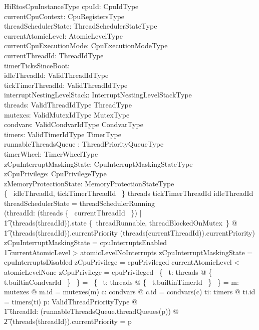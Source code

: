 \documentclass[11pt,letterpaper,twoside,openany]{book}
\begin{document}
\begin{schema}{HiRtosCpuInstanceType}
    cpuId: CpuIdType \\
    currentCpuContext: CpuRegistersType \\
    threadSchedulerState: ThreadSchedulerStateType \\
    currentAtomicLevel: AtomicLevelType \\
    currentCpuExecutionMode: CpuExecutionModeType \\
    currentThreadId: ThreadIdType \\
    timerTicksSinceBoot: \nat \\
    idleThreadId: ValidThreadIdType \\
    tickTimerThreadId: ValidThreadIdType \\
    interruptNestingLevelStack: InterruptNestingLevelStackType \\
    threads: ValidThreadIdType \finj ThreadType \\
    mutexes: ValidMutexIdType \finj MutexType \\
    condvars: ValidCondvarIdType \finj CondvarType \\
    timers: ValidTimerIdType \finj TimerType \\
    runnableThreadsQueue : ThreadPriorityQueueType \\
    timerWheel: TimerWheelType \\
    zCpuInterruptMaskingState: CpuInterruptMaskingStateType \\
    zCpuPrivilege: CpuPrivilegeType \\
    zMemoryProtectionState: MemoryProtectionStateType \\
\where
    \{~ idleThreadId, tickTimerThreadId ~\} \subseteq \dom threads
\also
    tickTimerThreadId \neq idleThreadId
\also
    threadSchedulerState = threadSchedulerRunning \implies \\
    (\forall threadId: (\dom threads \setminus \{~ currentThreadId ~\}) | \\
\t1    (threads(threadId)).state \in \{~threadRunnable, threadBlockedOnMutex~\}  @ \\
\t1    (threads(threadId)).currentPriority \leq (threads(currentThreadId)).currentPriority)
\also
    zCpuInterruptMaskingState = cpuInterruptsEnabled \iff \\
\t1 currentAtomicLevel > atomicLevelNoInterrupts
\also
    zCpuInterruptMaskingState = cpuInterruptsDisabled \implies zCpuPrivilege = cpuPrivileged
\also
    currentAtomicLevel < atomicLevelNone \implies zCpuPrivilege = cpuPrivileged
\also
    \bigcap~\{~ t: \ran threads @ \{~ t.builtinCondvarId ~\} ~\} = \emptyset
\also
    \bigcap~\{~ t: \ran threads @ \{~ t.builtinTimerId ~\} ~\} = \emptyset
\also
    \forall m: \ran mutexes @ m.id = mutexes\inv(m)
\also
    \forall c: \ran condvars @  c.id = condvars\inv(c)
\also
    \forall ti: \ran timers @ ti.id = timers\inv(ti)
\also
    \forall p: ValidThreadPriorityType @ \\
\t1    \forall threadId: \ran (runnableThreadsQueue.threadQueues(p)) @ \\
\t2    (threads(threadId)).currentPriority = p
\end{schema}
\end{document}

